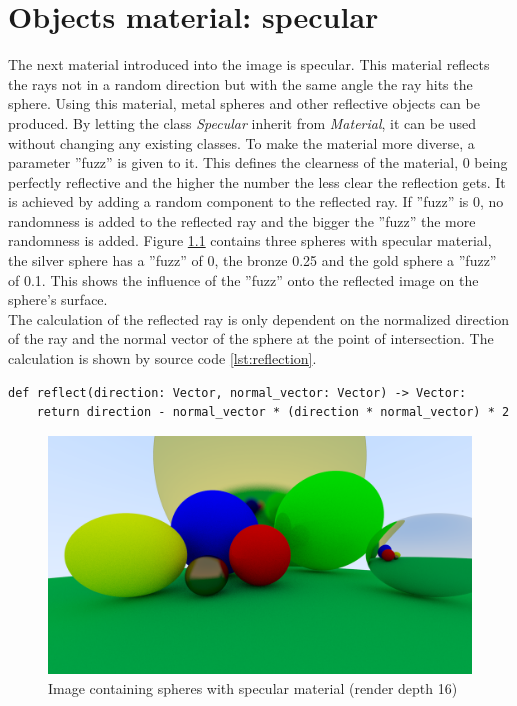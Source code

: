 \documentclass[12pt]{report}
\begin{document}
\chapter{Objects material: specular}
The next material introduced into the image is specular. This material reflects the rays not in a random direction but with the same angle the ray hits the sphere. Using this material, metal spheres and other reflective objects can be produced. By letting the class \textit{Specular} inherit from \textit{Material}, it can be used without changing any existing classes. To make the material more diverse, a parameter ''fuzz'' is given to it. This defines the clearness of the material, 0 being perfectly reflective and the higher the number the less clear the reflection gets. It is achieved by adding a random component to the reflected ray. If ''fuzz'' is 0, no randomness is added to the reflected ray and the bigger the ''fuzz'' the more randomness is added. Figure \ref{fig:step6} contains three spheres with specular material, the silver sphere has a ''fuzz'' of 0, the bronze 0.25 and the gold sphere a ''fuzz'' of 0.1. This shows the influence of the ''fuzz'' onto the reflected image on the sphere's surface. \\
The calculation of the reflected ray is only dependent on the normalized direction of the ray and the normal vector of the sphere at the point of intersection. The calculation is shown by source code \ref{lst:reflection}.
\begin{lstlisting}[caption={Calculating reflected ray}, label=lst:reflection, style=mystyle]
def reflect(direction: Vector, normal_vector: Vector) -> Vector:
    return direction - normal_vector * (direction * normal_vector) * 2
\end{lstlisting}
\begin{figure}[h!]
\includegraphics[width=\textwidth]{step6}
\centering
\caption{Image containing spheres with specular material (render depth 16)}
\label{fig:step6}
\end{figure}
\end{document}
